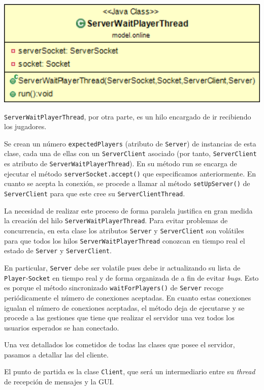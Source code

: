 \documentclass[../DocumentoOficial.tex]{subfiles}
\begin{document}
\begin{center}
\includegraphics[scale=0.3]{WaitPlayerThread-sprint7.png} 
\end{center}

\texttt{ServerWaitPlayerThread}, por otra parte, es un hilo encargado de ir recibiendo los jugadores.

Se crean un número \texttt{expectedPlayers} (atributo de \texttt{Server}) de instancias de esta clase, cada una de ellas con un \texttt{ServerClient} asociado (por tanto, \texttt{ServerClient} es atributo de \texttt{ServerWaitPlayerThread}). En su método run se encarga de ejecutar el método \texttt{serverSocket.accept()} que especificamos anteriormente. En cuanto se acepta la conexión, se procede a llamar al método \texttt{setUpServer()} de \texttt{ServerClient} para que este cree su \texttt{ServerClientThread}.

La necesidad de realizar este proceso de forma paralela justifica en gran medida la creación del hilo \texttt{ServerWaitPlayerThread}. Para evitar problemas de concurrencia, en esta clase los atributos \texttt{Server} y \texttt{ServerClient} son volátiles para que todos los hilos \texttt{ServerWaitPlayerThread} conozcan en tiempo real el estado de \texttt{Server} y \texttt{ServerClient}.

En particular, \texttt{Server} debe ser volatile pues debe ir actualizando su lista de \texttt{Player}-\texttt{Socket} en tiempo real y de forma organizada de a fin de evitar \textit{bugs}. Esto es porque el método sincronizado \texttt{waitForPlayers()} de \texttt{Server} recoge periódicamente el número de conexiones aceptadas. En cuanto estas conexiones igualan el número de conexiones aceptadas, el método deja de ejecutarse y se procede a las gestiones que tiene que realizar el servidor una vez todos los usuarios esperados se han conectado.

Una vez detallados los cometidos de todas las clases que posee el servidor, pasamos a detallar las del cliente.

El punto de partida es la clase \texttt{Client}, que será un intermediario entre su \textit{thread} de recepción de mensajes y la GUI.
\end{document}
